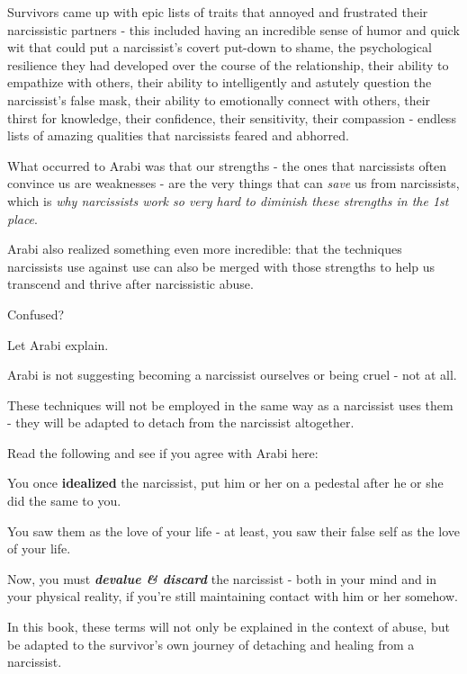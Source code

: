 \documentclass[oneside]{book}
\numberwithin{equation}{section}
\begin{document}
%
Survivors came up with epic lists of traits that annoyed and frustrated their narcissistic partners - this included having an incredible sense of humor and quick wit that could put a narcissist's covert put-down to shame, the psychological resilience they had developed over the course of the relationship, their ability to empathize with others, their ability to intelligently and astutely question the narcissist's false mask, their ability to emotionally connect with others, their thirst for knowledge, their confidence, their sensitivity, their compassion - endless lists of amazing qualities that narcissists feared and abhorred.

%
What occurred to Arabi was that our strengths - the ones that narcissists often convince us are weaknesses - are the very things that can \textit{save} us from narcissists, which is \textit{why narcissists work so very hard to diminish these strengths in the 1st place}.

Arabi also realized something even more incredible: that the techniques narcissists use against use can also be merged with those strengths to help us transcend and thrive after narcissistic abuse.

%

Confused?

Let Arabi explain.

Arabi is not suggesting becoming a narcissist ourselves or being cruel - not at all.

These techniques will not be employed in the same way as a narcissist uses them - they will be adapted to detach from the narcissist altogether.

Read the following and see if you agree with Arabi here:

%
You once \textbf{idealized} the narcissist, put him or her on a pedestal after he or she did the same to you.

You saw them as the love of your life - at least, you saw their false self as the love of your life.

%
Now, you must \textbf{\textit{devalue \& discard}} the narcissist - both in your mind and in your physical reality, if you're still maintaining contact with him or her somehow.

In this book, these terms will not only be explained in the context of abuse, but be adapted to the survivor's own journey of detaching and healing from a narcissist.
\end{document}
